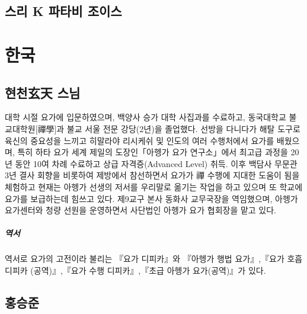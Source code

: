 \documentclass[12pt, a4paper, oneside]{book}
\let\stdsection\section
\renewcommand\section{\newpage\stdsection}
\begin{document}
	\section{스리 K 파타비 조이스 }


	\chapter{한국}
	\minitoc

%
	\section{현천玄天 스님}

대학 시절 요가에 입문하였으며, 백양사 승가 대학 사집과를 수료하고, 동국대학교 불교대학원[禪學]과 불교 서울 전문 강당(2년)을 졸업했다. 선방을 다니다가 해탈 도구로 육신의 중요성을 느끼고 히말라야 리시케쉬 및 인도의 여러 수행처에서 요가를 배웠으며, 특히 하타 요가 세계 제일의 도장인「아헹가 요가 연구소」에서 최고급 과정을 20년 동안 10여 차례 수료하고 상급 자격증(Advanced Level) 취득.
이후 백담사 무문관 3년 결사 회향을 비롯하여 제방에서 참선하면서 요가가 禪 수행에 지대한 도움이 됨을 체험하고 현재는 아헹가 선생의 저서를 우리말로 옮기는 작업을 하고 있으며 또 학교에 요가를 보급하는데 힘쓰고 있다.
제9교구 본사 동화사 교무국장을 역임했으며, 아헹가 요가센터와 청량 선원을 운영하면서 사단법인 아헹가 요가 협회장을 맡고 있다.

\paragraph{역서}
역서로 요가의 고전이라 불리는 『요가 디피카』와 『아헹가 행법 요가』,『요가 호흡 디피카 (공역)』,『요가 수행 디피카』,『초급 아헹가 요가(공역)』가 있다. 





%
	\section{홍승준}


%
\end{document}
